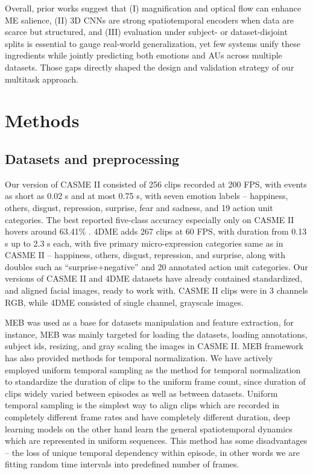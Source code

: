 \documentclass{article}
\begin{document}
Overall, prior works suggest that (I) magnification and optical flow can enhance ME salience, (II) 3D CNNs are strong spatiotemporal encoders when data are scarce but structured, and (III) evaluation under subject- or dataset-disjoint splits is essential to gauge real-world generalization, yet few systems unify these ingredients while jointly predicting both emotions and AUs across multiple datasets. Those gaps directly shaped the design and validation strategy of our multitask approach.
\section{Methods  }
\subsection{Datasets and preprocessing}
Our version of CASME II consisted of 256 clips recorded at 200 FPS, with events as short as 0.02 s and at most 0.75 s, with seven emotion labels – happiness, others, disgust, repression, surprise, fear and sadness, and 19 action unit categories. The best reported five-class accuracy especially only on CASME II hovers around 63.41\% \cite{yan2014}. 4DME adds 267 clips at 60 FPS, with duration from 0.13 s up to 2.3 s each, with five primary micro-expression categories same as in CASME II – happiness, others, disgust, repression, and surprise, along with doubles such as “surprise+negative” and 20 annotated action unit categories. Our versions of CASME II and 4DME datasets have already contained standardized, and aligned facial images, ready to work with. CASME II clips were in 3 channels RGB, while 4DME consisted of single channel, grayscale images.

MEB was used as a base for datasets manipulation and feature extraction, for instance, MEB was mainly targeted for loading the datasets, loading annotations, subject ids, resizing, and gray scaling the images in CASME II. MEB framework has also provided methods for temporal normalization. We have actively employed uniform temporal sampling as the method for temporal normalization to standardize the duration of clips to the uniform frame count, since duration of clips widely varied between episodes as well as between datasets. Uniform temporal sampling is the simplest way to align clips which are recorded in completely different frame rates and have completely different duration, deep learning models on the other hand learn the general spatiotemporal dynamics which are represented in uniform sequences. This method has some disadvantages – the loss of unique temporal dependency within episode, in other words we are fitting random time intervals into predefined number of frames.
\end{document}
